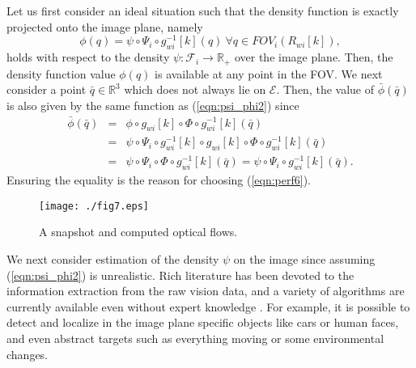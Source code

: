 \documentclass[conference,letterpaper]{ieeeconf}
\newcommand{\E}{{\mathcal E}}
\newcommand{\F}{{\mathcal F}}
\newcommand{\R}{{\mathbb R}}
\newcommand{\ewi}{R_{wi}}
\begin{document}
Let us first consider an ideal situation such that the density function
is exactly projected onto the image plane, namely
\begin{equation}
\phi(q) = \psi \circ \Psi_i \circ g_{wi}^{-1}[k](q)\ {\forall q} \in FOV_i(\ewi[k]),
\label{eqn:psi_phi2}
\end{equation}
holds with respect to the density $\psi: \F_i \to \R_+$ over the image plane.
Then, the density function value $\phi(q)$ is available at
any point in the FOV.
We next consider a point $\bar q \in \R^3$
which does not always lie on $\E$. 
Then, the value of $\bar \phi(\bar q)$ is also given by 
the same function as (\ref{eqn:psi_phi2}) since
\begin{eqnarray}
\bar \phi(\bar q) \!\!&\!\!=\!\!&\!\! \phi\circ g_{wi}[k]\circ \Phi \circ g_{wi}^{-1}[k] (\bar q)
\nonumber\\
\!\!&\!\!=\!\!&\!\! \psi \circ \Psi_i \circ g_{wi}^{-1}[k] \circ g_{wi}[k]\circ \Phi \circ g_{wi}^{-1}[k] (\bar q)
\nonumber\\
\!\!&\!\!=\!\!&\!\! \psi \circ \Psi_i \circ \Phi \circ g_{wi}^{-1}[k] (\bar q)
= \psi \circ \Psi_i \circ g_{wi}^{-1}[k] (\bar q).
\nonumber
\end{eqnarray}
Ensuring the equality is the reason for choosing 
(\ref{eqn:perf6}).



\begin{figure}
\begin{center}
\texttt{[image: ./fig7.eps]}
\caption{A snapshot and computed optical flows.}
\label{fig:snapshot}
\end{center}
\end{figure}















We next consider estimation of the density $\psi$ on the image
since assuming (\ref{eqn:psi_phi2}) is unrealistic. 
Rich literature has been devoted to the
information extraction from the raw vision data,
and a variety of algorithms are currently available 
even without expert knowledge \cite{MATLAB1}.
For example, it is possible to detect and localize in the image plane
specific objects like cars or human faces, and even abstract targets such as everything moving 
or some environmental changes.
\end{document}
